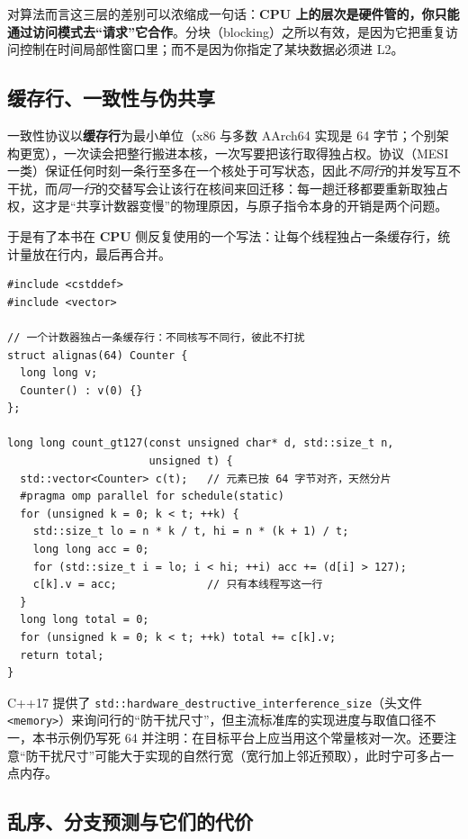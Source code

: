 \documentclass[12pt,a4paper,fontset=fandol]{ctexbook}
\newcommand{\cpp}[1]{C++#1}
\newcommand{\Tp}[1]{\texttt{#1}}
\newcommand{\Bk}{\allowbreak}
\newcommand{\Dom}[1]{\textsf{\bfseries #1}}
\newcommand{\CPU}{\Dom{CPU}}
\begin{document}
对算法而言这三层的差别可以浓缩成一句话：\textbf{\CPU{} 上的层次是硬件管的，你只能通过访问模式去``请求''它合作}。分块（blocking）之所以有效，是因为它把重复访问控制在时间局部性窗口里；而不是因为你指定了某块数据必须进 L2。

\subsection{缓存行、一致性与伪共享}

一致性协议以\textbf{缓存行}为最小单位（x86 与多数 AArch64 实现是 64 字节；个别架构更宽），一次读会把整行搬进本核，一次写要把该行取得独占权。协议（MESI 一类）保证任何时刻一条行至多在一个核处于可写状态，因此\emph{不同行}的并发写互不干扰，而\emph{同一行}的交替写会让该行在核间来回迁移：每一趟迁移都要重新取独占权，这才是``共享计数器变慢''的物理原因，与原子指令本身的开销是两个问题。

于是有了本书在 \CPU{} 侧反复使用的一个写法：让每个线程独占一条缓存行，统计量放在行内，最后再合并。

\begin{lstlisting}[style=cppstyle,caption={按缓存行分片的计数：无原子、无锁、无跨行迁移}]
#include <cstddef>
#include <vector>

// 一个计数器独占一条缓存行：不同核写不同行，彼此不打扰
struct alignas(64) Counter {
  long long v;
  Counter() : v(0) {}
};

long long count_gt127(const unsigned char* d, std::size_t n,
                      unsigned t) {
  std::vector<Counter> c(t);   // 元素已按 64 字节对齐，天然分片
  #pragma omp parallel for schedule(static)
  for (unsigned k = 0; k < t; ++k) {
    std::size_t lo = n * k / t, hi = n * (k + 1) / t;
    long long acc = 0;
    for (std::size_t i = lo; i < hi; ++i) acc += (d[i] > 127);
    c[k].v = acc;              // 只有本线程写这一行
  }
  long long total = 0;
  for (unsigned k = 0; k < t; ++k) total += c[k].v;
  return total;
}
\end{lstlisting}

\cpp{17} 提供了 \Tp{std::hardware\Bk\_destructive\Bk\_interference\Bk\_size}（头文件 \Tp{<memory>}）来询问行的``防干扰尺寸''，但主流标准库的实现进度与取值口径不一，本书示例仍写死 64 并注明：在目标平台上应当用这个常量核对一次。还要注意``防干扰尺寸''可能大于实现的自然行宽（宽行加上邻近预取），此时宁可多占一点内存。

\subsection{乱序、分支预测与它们的代价}
\end{document}
